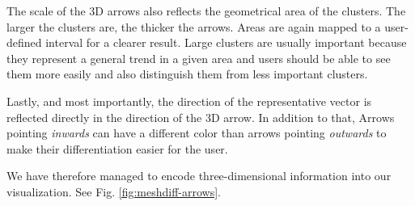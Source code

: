 The scale of the 3D arrows also reflects the geometrical area of the clusters. The larger the clusters are, the thicker the arrows. Areas are again mapped to a user-defined interval for a clearer result. Large clusters are usually important because they represent a general trend in a given area and users should be able to see them more easily and also distinguish them from less important clusters.

Lastly, and most importantly, the direction of the representative vector is reflected directly in the direction of the 3D arrow. In addition to that, Arrows pointing {\it inwards} can have a different color than arrows pointing {\it outwards} to make their differentiation easier for the user.

We have therefore managed to encode three-dimensional information into our visualization. See Fig. \ref{fig:meshdiff-arrows}.

